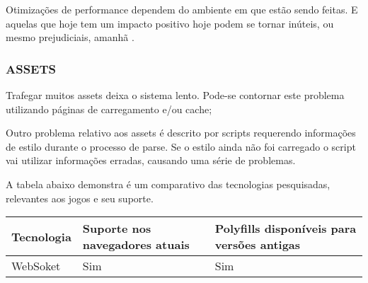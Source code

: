 Otimizações de performance dependem do ambiente em que estão
sendo feitas. E aquelas que hoje tem um impacto positivo hoje
podem se tornar inúteis, ou mesmo prejudiciais, amanhã
\autocite[pp.131]{html5mostwanted}.

\subsubsection{ASSETS}

Trafegar muitos assets deixa o sistema lento. Pode-se contornar este
problema utilizando páginas de carregamento e/ou cache;

Outro problema relativo aos assets é descrito por \cite{howBrowsersWork}
scripts requerendo informações de estilo durante o processo de
parse. Se o estilo ainda não foi carregado o script vai utilizar
informações erradas, causando uma série de problemas.


A tabela abaixo demonstra é um comparativo das tecnologias
pesquisadas, relevantes aos jogos e seu suporte.

\begin{tabular}{ |p{3cm}|p{3cm}|p{3cm}|  }
\hline
Tecnologia & Suporte nos navegadores atuais & Polyfills disponíveis  para versões antigas \\
\hline
WebSoket & Sim & Sim \\
\hline
\end{tabular}

